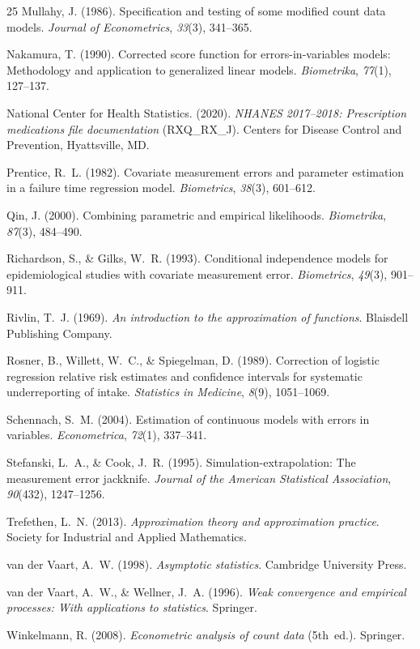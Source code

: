 \begin{thebibliography}{25}
Mullahy, J. (1986). Specification and testing of some modified count
data models. \emph{Journal of Econometrics}, \emph{33}(3), 341--365.

Nakamura, T. (1990). Corrected score function for errors-in-variables
models: Methodology and application to generalized linear models.
\emph{Biometrika}, \emph{77}(1), 127--137.

National Center for Health Statistics. (2020). \emph{NHANES 2017--2018:
Prescription medications file documentation} (RXQ\_RX\_J). Centers for
Disease Control and Prevention, Hyattsville, MD.

Prentice, R.~L. (1982). Covariate measurement errors and parameter
estimation in a failure time regression model. \emph{Biometrics},
\emph{38}(3), 601--612.

Qin, J. (2000). Combining parametric and empirical likelihoods.
\emph{Biometrika}, \emph{87}(3), 484--490.

Richardson, S., \& Gilks, W.~R. (1993). Conditional independence models
for epidemiological studies with covariate measurement error.
\emph{Biometrics}, \emph{49}(3), 901--911. %

Rivlin, T.~J. (1969). \emph{An introduction to the approximation of
functions}. Blaisdell Publishing Company.

Rosner, B., Willett, W.~C., \& Spiegelman, D. (1989). Correction of
logistic regression relative risk estimates and confidence intervals
for systematic underreporting of intake. \emph{Statistics in Medicine},
\emph{8}(9), 1051--1069.

Schennach, S.~M. (2004). Estimation of continuous models with errors in
variables. \emph{Econometrica}, \emph{72}(1), 337--341. %

Stefanski, L.~A., \& Cook, J.~R. (1995). Simulation-extrapolation: The
measurement error jackknife. \emph{Journal of the American Statistical
Association}, \emph{90}(432), 1247--1256.

Trefethen, L.~N. (2013). \emph{Approximation theory and approximation
practice}. Society for Industrial and Applied Mathematics.

van der Vaart, A.~W. (1998). \emph{Asymptotic statistics}. Cambridge
University Press.

van der Vaart, A.~W., \& Wellner, J.~A. (1996). \emph{Weak convergence
and empirical processes: With applications to statistics}. Springer.

Winkelmann, R. (2008). \emph{Econometric analysis of count data}
(5th~ed.). Springer.
\end{thebibliography}
